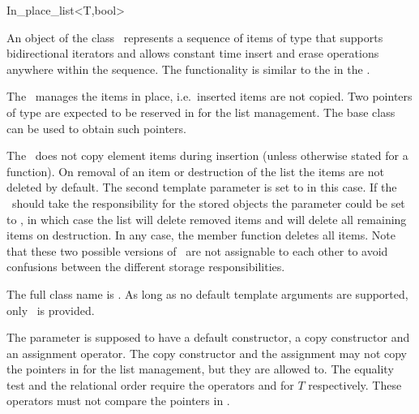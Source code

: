 \begin{ccClassTemplate}{In_place_list<T,bool>}

\ccDefinition

An object of the class \ccClassTemplateName\ represents a sequence of
items of type  that supports bidirectional iterators and allows
constant time insert and erase operations anywhere within the
sequence. The functionality is similar to the  in the
\stl.

The \ccClassTemplateName\ manages the items in place, i.e.~inserted
items are not copied. Two pointers of type  are expected
to be reserved in  for the list management. The base class
 can be used to obtain such pointers.

The \ccClassTemplateName\ does not copy element items during insertion
(unless otherwise stated for a function). On removal of an item or
destruction of the list the items are not deleted by default.  The
second template parameter  is set to  in
this case. If the \ccClassTemplateName\ should take the responsibility
for the stored objects the  parameter could be set to
, in which case the list will delete removed items and
will delete all remaining items on destruction. In any case, the
 member function deletes all items.  Note that
these two possible versions of \ccClassTemplateName\ are not
assignable to each other to avoid confusions between the different
storage responsibilities.


\ccParameters

The full class name is . As long as no default template arguments are
supported, only \ccClassTemplateName\ is provided.

The parameter  is supposed to have a default constructor, a
copy constructor and an assignment operator. The copy constructor and
the assignment may not copy the pointers in  for the list
management, but they are allowed to. The equality test and the
relational order require the operators \ccStyle{==} and \ccStyle{<}
for $T$ respectively. These operators must not compare the pointers in
.


\end{ccClassTemplate}
